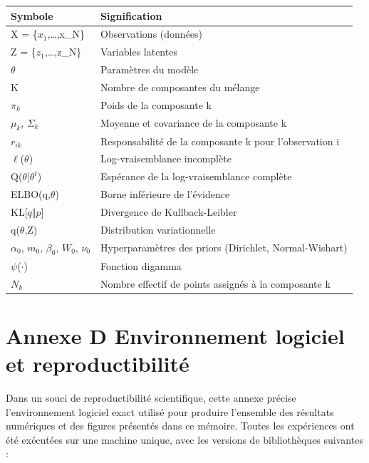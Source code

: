\begin{table}[H]
\centering
\small
\setlength{\tabcolsep}{0.14cm}
\begin{tabular}{|p{7.42cm}|p{7.42cm}|}
\hline
\textbf{Symbole} & \textbf{Signification} \\
\hline
X = \{$x_{1}$,\ldots{},x\_N\} & Observations (données) \\
\hline
Z = \{$z_{1}$,\ldots{},z\_N\} & Variables latentes \\
\hline
$\theta $ & Paramètres du modèle \\
\hline
K & Nombre de composantes du mélange \\
\hline
$\pi _{k}$ & Poids de la composante k \\
\hline
$\mu _{k}$, $\Sigma _{k}$ & Moyenne et covariance de la composante k \\
\hline
$r_{ik}$ & Responsabilité de la composante k pour l'observation i \\
\hline
$\ell $($\theta $) & Log-vraisemblance incomplète \\
\hline
Q($\theta $|$\theta ^{t}$) & Espérance de la log-vraisemblance complète \\
\hline
ELBO(q,$\theta $) & Borne inférieure de l'évidence \\
\hline
KL[$q\Vert p$] & Divergence de Kullback-Leibler \\
\hline
q($\theta $,Z) & Distribution variationnelle \\
\hline
$\alpha _{0}$, $m_{0}$, $\beta _{0}$, $W_{0}$, $\nu _{0}$ & Hyperparamètres des priors (Dirichlet, Normal-Wishart) \\
\hline
$\psi $($\cdot $) & Fonction digamma \\
\hline
$N_{k}$ & Nombre effectif de points assignés à la composante k \\
\hline
\end{tabular}
\end{table}
\section*{Annexe D  Environnement logiciel et reproductibilité}
Dans un souci de reproductibilité scientifique, cette annexe précise l'environnement logiciel exact utilisé pour produire l'ensemble des résultats numériques et des figures présentés dans ce mémoire. Toutes les expériences ont été exécutées sur une machine unique, avec les versions de bibliothèques suivantes :

